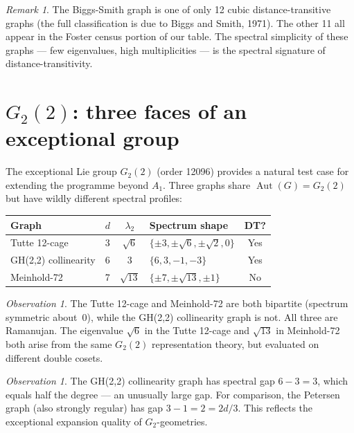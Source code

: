 \documentclass[11pt,a4paper]{article}
\theoremstyle{plain}
\theoremstyle{definition}
\theoremstyle{remark}
\newtheorem{remark}[theorem]{Remark}
\newtheorem{observation}[theorem]{Observation}
\newcommand{\Aut}{\operatorname{Aut}}
\begin{document}
\begin{remark}
The Biggs-Smith graph is one of only 12 cubic distance-transitive graphs
(the full classification is due to Biggs and Smith, 1971). The other 11
all appear in the Foster census portion of our table. The spectral
simplicity of these graphs --- few eigenvalues, high multiplicities ---
is the spectral signature of distance-transitivity.
\end{remark}


\section{$G_2(2)$: three faces of an exceptional group}

The exceptional Lie group $G_2(2)$ (order 12096) provides a natural test
case for extending the programme beyond $A_1$. Three graphs share
$\Aut(G) = G_2(2)$ but have wildly different spectral profiles:

\begin{center}
\small
\begin{tabular}{@{}l c c l c@{}}
\toprule
Graph & $d$ & $\lambda_2$ & Spectrum shape & DT? \\
\midrule
Tutte 12-cage & 3 & $\sqrt{6}$ & $\{{\pm}3, {\pm}\sqrt{6}, {\pm}\sqrt{2}, 0\}$ & Yes \\
GH(2,2) collinearity & 6 & 3 & $\{6, 3, -1, -3\}$ & Yes \\
Meinhold-72 & 7 & $\sqrt{13}$ & $\{{\pm}7, {\pm}\sqrt{13}, {\pm}1\}$ & No \\
\bottomrule
\end{tabular}
\end{center}

\begin{observation}
The Tutte 12-cage and Meinhold-72 are both bipartite (spectrum symmetric
about~0), while the GH(2,2) collinearity graph is not. All three are
Ramanujan. The eigenvalue $\sqrt{6}$ in the Tutte 12-cage and $\sqrt{13}$
in Meinhold-72 both arise from the same $G_2(2)$ representation theory,
but evaluated on different double cosets.
\end{observation}

\begin{observation}
The GH(2,2) collinearity graph has spectral gap $6 - 3 = 3$, which equals
half the degree --- an unusually large gap. For comparison, the Petersen
graph (also strongly regular) has gap $3 - 1 = 2 = 2d/3$. This reflects the
exceptional expansion quality of $G_2$-geometries.
\end{observation}
\end{document}
